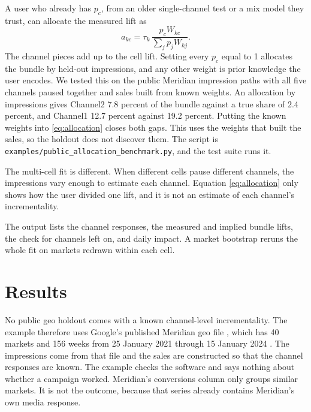 \documentclass[preprint,12pt]{elsarticle}
\begin{document}
A user who already has $p_{c}$, from an older single-channel test or a mix model they trust, can allocate the measured lift as
\begin{equation}
\label{eq:allocation}
a_{kc} = \tau_{k}\,\frac{p_{c} W_{kc}}{\sum_{j} p_{j} W_{kj}}.
\end{equation}
The channel pieces add up to the cell lift. Setting every $p_{c}$ equal to 1 allocates the bundle by held-out impressions, and any other weight is prior knowledge the user encodes. We tested this on the public Meridian impression paths with all five channels paused together and sales built from known weights. An allocation by impressions gives Channel2 7.8 percent of the bundle against a true share of 2.4 percent, and Channel1 12.7 percent against 19.2 percent. Putting the known weights into \eqref{eq:allocation} closes both gaps. This uses the weights that built the sales, so the holdout does not discover them. The script is \texttt{examples/public\_allocation\_benchmark.py}, and the test suite runs it.

The multi-cell fit is different. When different cells pause different channels, the impressions vary enough to estimate each channel. Equation \eqref{eq:allocation} only shows how the user divided one lift, and it is not an estimate of each channel's incrementality.

The output lists the channel responses, the measured and implied bundle lifts, the check for channels left on, and daily impact. A market bootstrap reruns the whole fit on markets redrawn within each cell.

\section{Results}
\label{sec:example}

No public geo holdout comes with a known channel-level incrementality. The example therefore uses Google's published Meridian geo file , which has 40 markets and 156 weeks from 25 January 2021 through 15 January 2024 \cite{meridiandata}. The impressions come from that file and the sales are constructed so that the channel responses are known. The example checks the software and says nothing about whether a campaign worked. Meridian's conversions column only groups similar markets. It is not the outcome, because that series already contains Meridian's own media response.
\end{document}
